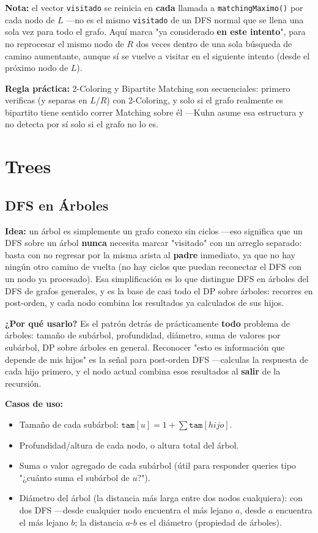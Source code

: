 \documentclass[10pt,a4paper,twocolumn]{article}
\begin{document}
\textbf{Nota:} el vector \texttt{visitado} se reinicia en \textbf{cada}
llamada a \texttt{matchingMaximo()} por cada nodo de $L$ —no es el
mismo \texttt{visitado} de un DFS normal que se llena una sola vez
para todo el grafo. Aquí marca "ya considerado \textbf{en este
	intento}", para no reprocesar el mismo nodo de $R$ dos veces dentro
de una sola búsqueda de camino aumentante, aunque sí se vuelve a
visitar en el siguiente intento (desde el próximo nodo de $L$).

\textbf{Regla práctica:} 2-Coloring y Bipartite Matching son
secuenciales: primero verificas (y separas en $L$/$R$) con
2-Coloring, y solo si el grafo realmente es bipartito tiene sentido
correr Matching sobre él —Kuhn asume esa estructura y no detecta por
sí solo si el grafo no lo es.


\section{Trees}
\subsection{DFS en Árboles}

\textbf{Idea:} un árbol es simplemente un grafo conexo sin ciclos
—eso significa que un DFS sobre un árbol \textbf{nunca} necesita
marcar "visitado" con un arreglo separado: basta con no regresar por
la misma arista al \textbf{padre} inmediato, ya que no hay ningún
otro camino de vuelta (no hay ciclos que puedan reconectar el DFS con
un nodo ya procesado). Esa simplificación es lo que distingue DFS en
árboles del DFS de grafos generales, y es la base de casi todo el DP
sobre árboles: recorres en post-orden, y cada nodo combina los
resultados ya calculados de sus hijos.

\textbf{¿Por qué usarlo?} Es el patrón detrás de prácticamente
\textbf{todo} problema de árboles: tamaño de subárbol, profundidad,
diámetro, suma de valores por subárbol, DP sobre árboles en general.
Reconocer "esto es información que depende de mis hijos" es la señal
para post-orden DFS —calculas la respuesta de cada hijo primero, y el
nodo actual combina esos resultados al \textbf{salir} de la
recursión.

\textbf{Casos de uso:}

\begin{itemize}
	\item Tamaño de cada subárbol: $\texttt{tam}[u] = 1 + \sum
	\texttt{tam}[hijo]$.
	\item Profundidad/altura de cada nodo, o altura total del árbol.
	\item Suma o valor agregado de cada subárbol (útil para
	responder queries tipo "¿cuánto suma el subárbol de $u$?").
	\item Diámetro del árbol (la distancia más larga entre dos
	nodos cualquiera): con dos DFS —desde cualquier nodo encuentra el
	más lejano $a$, desde $a$ encuentra el más lejano $b$; la
	distancia $a$-$b$ es el diámetro (propiedad de árboles).
\end{itemize}
\end{document}
